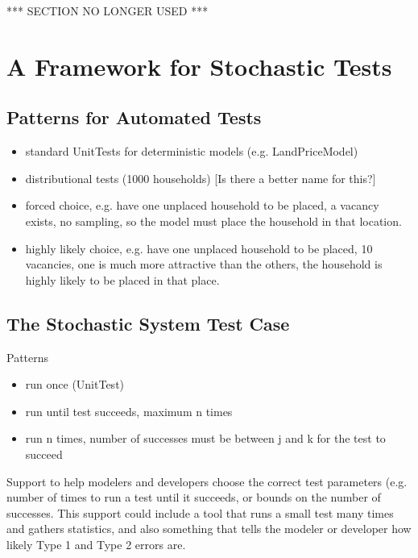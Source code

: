 
*** SECTION NO LONGER USED ***

\section{A Framework for Stochastic Tests}

\subsection{Patterns for Automated Tests}
\label{test-patterns}

  \begin{itemize}
    \item standard UnitTests for deterministic models (e.g. LandPriceModel)
    \item distributional tests (1000 households) [Is there a better name for this?]
    \item forced choice, e.g. have one unplaced household to be placed, a vacancy exists, no
    sampling, so the model must place the household in that location.
    \item highly likely choice, e.g. have one unplaced household to be placed, 10 vacancies,
    one is much more attractive than the others, the household is highly likely to be 
    placed in that place.
  \end{itemize}


\subsection{The Stochastic System Test Case}

Patterns
\begin{itemize}
  \item run once (UnitTest)
  \item run until test succeeds, maximum n times
  \item run n times, number of successes must be between j and k for the test to succeed
\end{itemize}

Support to help modelers and developers choose the correct test parameters (e.g. number of times
to run a test until it succeeds, or bounds on the number of successes.  This support could include
a tool that runs a small test many times and gathers statistics, and also something that tells the
modeler or developer how likely Type 1 and Type 2 errors are.

